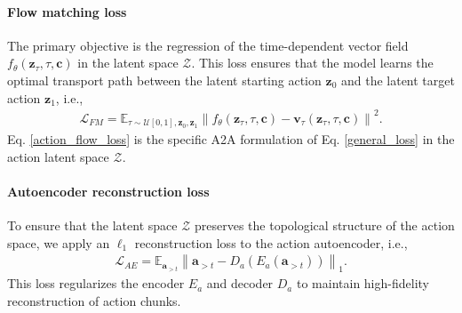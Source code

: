 \documentclass[onecolumn]{fairmeta}
\newcommand{\m}[1]{{A2A}}
\begin{document}
	\paragraph{Flow matching loss} The primary objective is the regression of the time-dependent vector field $f_\theta(\mathbf{z}_\tau, \tau, \mathbf{c})$ in the latent space $\mathcal{Z}$. This loss ensures that the model learns the optimal transport path between the latent starting action $\mathbf{z}_0$ and the latent target action $\mathbf{z}_1$, i.e.,
	\begin{equation}
		\begin{aligned}
			\mathcal{L}_{FM} = \mathbb{E}_{\tau \sim \mathcal{U}[0,1], \mathbf{z}_0, \mathbf{z}_1} \left\| f_\theta(\mathbf{z}_\tau, \tau, \mathbf{c}) - \mathbf{v}_\tau(\mathbf{z}_\tau, \tau, \mathbf{c}) \right\|^2.
			\label{action_flow_loss}
		\end{aligned}
	\end{equation}
	Eq. \eqref{action_flow_loss} is the specific \m{} formulation of Eq. \eqref{general_loss} in the action latent space $\mathcal{Z}$.
	
	\paragraph{Autoencoder reconstruction loss} To ensure that the latent space $\mathcal{Z}$ preserves the topological structure of the action space, we apply an $\ell_1$ reconstruction loss to the action autoencoder, i.e.,
	\begin{equation}
		\begin{aligned}
			\mathcal{L}_{AE} = \mathbb{E}_{\mathbf{a}_{> t}} \left\| \mathbf{a}_{> t} - D_a(E_a(\mathbf{a}_{> t})) \right\|_1.
		\end{aligned}
	\end{equation}
	This loss regularizes the encoder $E_a$ and decoder $D_a$ to maintain high-fidelity reconstruction of action chunks.
	
\end{document}
